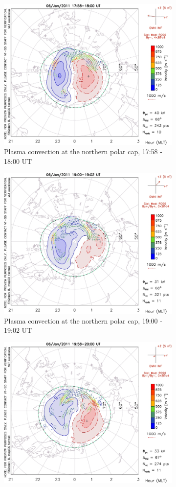 \documentclass[10pt,a4paper]{article}
\begin{document}
\begin{figure}[h]
	\begin{subfigure}[h]{.5\textwidth}
		\centering
		\includegraphics[width=.8\linewidth]{pot_1449158247.jpg}
		\caption{Plasma convection at the northern polar cap, 17:58 - 18:00 UT}
		\label{darn1}
	\end{subfigure}
	\begin{subfigure}[h]{.5\textwidth}
		\centering
		\includegraphics[width=.8\linewidth]{pot_1449158282.jpg}
		\caption{Plasma convection at the northern polar cap, 19:00 - 19:02 UT}
		\label{darn2}
	\end{subfigure}
	\begin{subfigure}[h]{.5\textwidth}
		\centering
		\includegraphics[width=.8\linewidth]{pot_1449158312.jpg}

\end{subfigure}
\end{figure}
\end{document}
